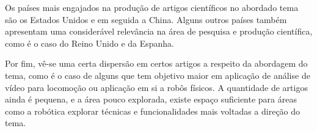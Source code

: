 Os países mais engajados na produção de artigos científicos no abordado tema são os Estados Unidos e em seguida a China. Alguns outros países também apresentam uma considerável relevância na área de pesquisa e produção científica, como é o caso do Reino Unido e da Espanha.

Por fim, vê-se uma certa dispersão em certos artigos a respeito da abordagem do tema, como é o caso de alguns que tem objetivo maior em aplicação de análise de vídeo para locomoção ou aplicação em si a robôs físicos. A quantidade de artigos ainda é pequena, e a área pouco explorada, existe espaço suficiente para áreas como a robótica explorar técnicas e funcionalidades mais voltadas a direção do tema.
